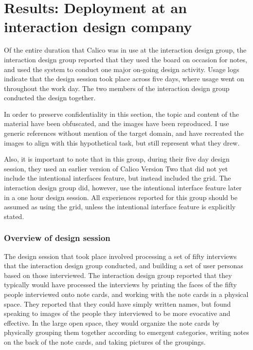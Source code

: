 \documentclass[12pt,fleqn]{ucithesis}
\begin{document}
\section{Results: Deployment at an interaction design company}
\label{chapter:evaluation:deployment2}

Of the entire duration that Calico was in use at the interaction design group, the interaction design group reported that they used the board on occasion for notes, and used the system to conduct one major on-going design activity. Usage logs indicate that the design session took place across five days, where usage went on throughout the work day. The two members of the interaction design group conducted the design together.

In order to preserve confidentiality in this section, the topic and content of the material have been obfuscated, and the images have been reproduced. I use generic references without mention of the target domain, and have recreated the images to align with this hypothetical task, but still represent what they drew.

Also, it is important to note that in this group, during their five day design session, they used an earlier version of Calico Version Two that did not yet include the intentional interfaces feature, but instead included the grid. The interaction design group did, however, use the intentional interface feature later in a one hour design session. All experiences reported for this group should be assumed as using the grid, unless the intentional interface feature is explicitly stated.

\subsubsection{Overview of design session}

The design session that took place involved processing a set of fifty interviews that the interaction design group conducted, and building a set of user personas based on those interviewed. The interaction design group reported that they typically would have processed the interviews by printing the faces of the fifty people interviewed onto note cards, and working with the note cards in a physical space. They reported that they could have simply written names, but found speaking to images of the people they interviewed to be more evocative and effective. In the large open space, they would organize the note cards by physically grouping them together according to emergent categories, writing notes on the back of the note cards, and taking pictures of the groupings. 
\end{document}
